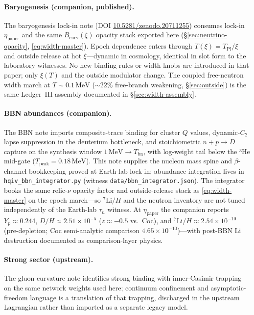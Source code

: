 \documentclass[11pt,notitlepage]{amsart}
\newcommand{\leanid}[1]{{\footnotesize\path{#1}}}
\begin{document}
\paragraph{Baryogenesis (companion, published).}
The baryogenesis lock-in note \cite{hqiv-baryogenesis-paper}
(DOI \href{https://doi.org/10.5281/zenodo.20711255}{10.5281/zenodo.20711255}) consumes
lock-in $\eta_{\mathrm{paper}}$ and the same $B_{\mathrm{curv}}(\xi)$ opacity stack
exported here (\S\ref{sec:neutrino-opacity}, \eqref{eq:width-master}). Epoch dependence
enters through $T(\xi)=T_{\mathrm{Pl}}/\xi$ and outside release at hot $\xi$---dynamic in
cosmology, identical in slot form to the laboratory witnesses. No new binding rules or
width knobs are introduced in that paper; only $\xi(T)$ and the outside modulator change.
The coupled free-neutron width march at $T\sim 0.1\,\mathrm{MeV}$ ($\sim 22\%$ free-branch
weakening, \S\ref{sec:outside}) is the same Ledger~III assembly documented in
\S\ref{sec:width-assembly}.

\paragraph{BBN abundances (companion).}
The BBN note \cite{hqiv-bbn-paper} imports composite-trace binding for cluster $Q$
values, dynamic-$C_2$ lapse suppression in the deuterium bottleneck, and
stoichiometric $n\!+\!p\!\to\!D$ capture on the synthesis window
$1\,\mathrm{MeV}\to T_{\mathrm{bn}}$, with log-weight tail
\leanid{bbnSynthesisDWindowTailGate} below the ³He mid-gate
($T_{\mathrm{peak}}=0.18\,\mathrm{MeV}$). This note supplies the nucleon mass spine and
$\beta$-channel bookkeeping proved at Earth-lab lock-in; abundance integration lives in
\texttt{hqiv\_bbn\_integrator.py} (witness \texttt{data/bbn\_integrator.json}). The
integrator books the same relic-$\nu$ opacity factor and outside-release stack as
\eqref{eq:width-master} on the epoch march---so $^7\mathrm{Li}/H$ and the neutron
inventory are not tuned independently of the Earth-lab $\tau_n$ witness. At
$\eta_{\mathrm{paper}}$ the companion reports $Y_p\approx 0.244$, $D/H\approx
2.51\times 10^{-5}$ ($z\approx -0.5$ vs.\ Coc), and $^7\mathrm{Li}/H\approx
2.54\times 10^{-10}$ (pre-depletion; Coc semi-analytic comparison
$4.65\times 10^{-10}$)---with post-BBN Li destruction documented as
comparison-layer physics.

\paragraph{Strong sector (upstream).}
The gluon curvature note \cite{hqiv-gluon-curvature-note} identifies strong binding with inner-Casimir
trapping on the same network weights used here; continuum confinement and asymptotic-freedom
language is a translation of that trapping, discharged in the upstream Lagrangian rather than
imported as a separate legacy model.
\end{document}

